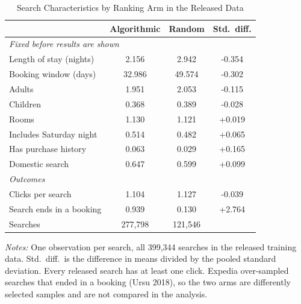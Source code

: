 \begin{table}[htbp]\centering
\caption{Search Characteristics by Ranking Arm in the Released Data}
\label{tab:sampling}
\begin{tabular}{lccc}
\toprule
 & Algorithmic & Random & Std.\ diff. \\
\midrule
\multicolumn{4}{l}{\textit{Fixed before results are shown}} \\
Length of stay (nights) & 2.156 & 2.942 & -0.354 \\
Booking window (days) & 32.986 & 49.574 & -0.302 \\
Adults & 1.951 & 2.053 & -0.115 \\
Children & 0.368 & 0.389 & -0.028 \\
Rooms & 1.130 & 1.121 & +0.019 \\
Includes Saturday night & 0.514 & 0.482 & +0.065 \\
Has purchase history & 0.063 & 0.029 & +0.165 \\
Domestic search & 0.647 & 0.599 & +0.099 \\
\midrule
\multicolumn{4}{l}{\textit{Outcomes}} \\
Clicks per search & 1.104 & 1.127 & -0.039 \\
Search ends in a booking & 0.939 & 0.130 & +2.764 \\
\midrule
Searches & 277,798 & 121,546 & \\
\bottomrule
\end{tabular}
\begin{minipage}{0.88\textwidth}\footnotesize\vspace{0.3em}
\textit{Notes:} One observation per search, all 399{,}344 searches in the released training data. Std.\ diff.\ is the difference in means divided by the pooled standard deviation. Every released search has at least one click. Expedia over-sampled searches that ended in a booking (Ursu 2018), so the two arms are differently selected samples and are not compared in the analysis.
\end{minipage}
\end{table}
